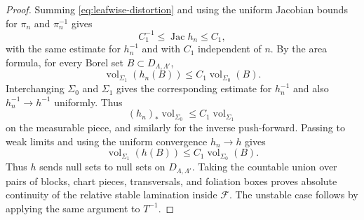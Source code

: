 \documentclass[10pt,a4paper]{amsart}
\begin{document}
\begin{proof}
Summing \eqref{eq:leafwise-distortion} and using the uniform Jacobian bounds
for $\pi_n$ and $\pi_n^{-1}$ gives
\begin{equation}\label{eq:leafwise-holonomy-jacobian}
 C_1^{-1}\le\operatorname{Jac}h_n\le C_1,
\end{equation}
with the same estimate for $h_n^{-1}$ and with $C_1$ independent of $n$.
By the area formula, for every Borel set
$B\subset D_{\Lambda,\Lambda'}$,
\[
 \operatorname{vol}_{\Sigma_1}(h_n(B))
 \le C_1\operatorname{vol}_{\Sigma_0}(B).
\]
Interchanging $\Sigma_0$ and $\Sigma_1$ gives the corresponding
estimate for $h_n^{-1}$ and also $h_n^{-1}\to h^{-1}$ uniformly.  Thus
\[
 (h_n)_*\operatorname{vol}_{\Sigma_0}
 \le C_1\operatorname{vol}_{\Sigma_1}
\]
on the measurable piece, and similarly for the inverse push-forward.
Passing to weak limits and using the uniform convergence $h_n\to h$ gives
\[
 \operatorname{vol}_{\Sigma_1}(h(B))
 \le C_1\operatorname{vol}_{\Sigma_0}(B).
\]
Thus $h$ sends null sets to null sets on
$D_{\Lambda,\Lambda'}$.  Taking the countable union over pairs of blocks,
chart pieces, transversals, and foliation boxes proves absolute continuity
of the relative stable lamination inside $\mathcal F$.  The unstable case
follows by applying the same argument to $T^{-1}$.
\end{proof}
\end{document}
